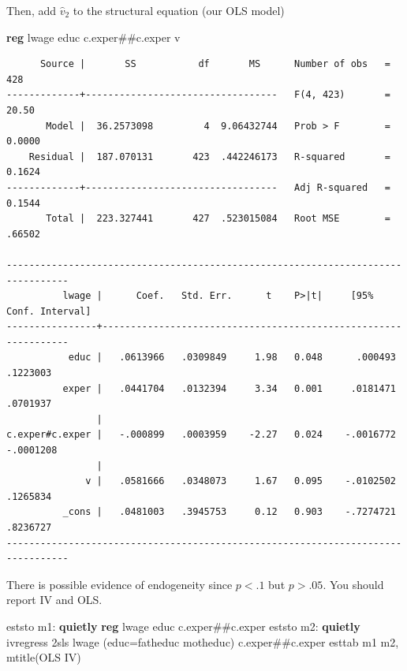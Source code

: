 \documentclass[
]{book}
\newenvironment{Shaded}{\begin{snugshade}}{\end{snugshade}}
\newcommand{\KeywordTok}[1]{\textcolor[rgb]{0.13,0.29,0.53}{\textbf{#1}}}
\newcommand{\NormalTok}[1]{#1}
\begin{document}
Then, add \(\hat{v}_2\) to the structural equation (our OLS model)

\begin{Shaded}
\begin{Highlighting}[]
\KeywordTok{reg}\NormalTok{ lwage educ c.exper\#\#c.exper v}
\end{Highlighting}
\end{Shaded}

\begin{verbatim}
      Source |       SS           df       MS      Number of obs   =       428
-------------+----------------------------------   F(4, 423)       =     20.50
       Model |  36.2573098         4  9.06432744   Prob > F        =    0.0000
    Residual |  187.070131       423  .442246173   R-squared       =    0.1624
-------------+----------------------------------   Adj R-squared   =    0.1544
       Total |  223.327441       427  .523015084   Root MSE        =    .66502

---------------------------------------------------------------------------------
          lwage |      Coef.   Std. Err.      t    P>|t|     [95% Conf. Interval]
----------------+----------------------------------------------------------------
           educ |   .0613966   .0309849     1.98   0.048      .000493    .1223003
          exper |   .0441704   .0132394     3.34   0.001     .0181471    .0701937
                |
c.exper#c.exper |   -.000899   .0003959    -2.27   0.024    -.0016772   -.0001208
                |
              v |   .0581666   .0348073     1.67   0.095    -.0102502    .1265834
          _cons |   .0481003   .3945753     0.12   0.903    -.7274721    .8236727
---------------------------------------------------------------------------------
\end{verbatim}

There is possible evidence of endogeneity since \(p < .1\) but \(p > .05\). You should report IV and OLS.

\begin{Shaded}
\begin{Highlighting}[]
\NormalTok{eststo m1: }\KeywordTok{quietly} \KeywordTok{reg}\NormalTok{ lwage educ c.exper\#\#c.exper}
\NormalTok{eststo m2: }\KeywordTok{quietly}\NormalTok{ ivregress 2sls lwage (educ=fatheduc motheduc) c.exper\#\#c.exper}
\NormalTok{esttab m1 m2, mtitle(OLS IV)}
\end{Highlighting}
\end{Shaded}
\end{document}
